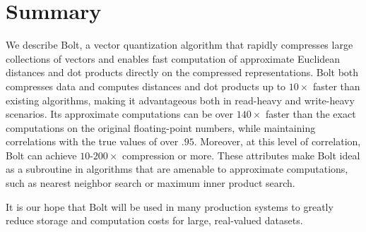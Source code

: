 \documentclass[sigconf]{acmart}  %
\begin{document}
\vspace{-1mm}
\section{Summary} \label{sec:conclusion}



We describe Bolt, a vector quantization algorithm that rapidly compresses large collections of vectors and enables fast computation of approximate Euclidean distances and dot products directly on the compressed representations. Bolt both compresses data and computes distances and dot products up to $10\times$ faster than existing algorithms, making it advantageous both in read-heavy and write-heavy scenarios. Its approximate computations can be over $140\times$ faster than the exact computations on the original floating-point numbers, while maintaining correlations with the true values of over $.95$. Moreover, at this level of correlation, Bolt can achieve $10$-$200\times$ compression or more. These attributes make Bolt ideal as a subroutine in algorithms that are amenable to approximate computations, such as nearest neighbor search or maximum inner product search. %

It is our hope that Bolt will be used in many production systems to greatly reduce storage and computation costs for large, real-valued datasets.


\vspace{-1mm}



% 

\end{document}
